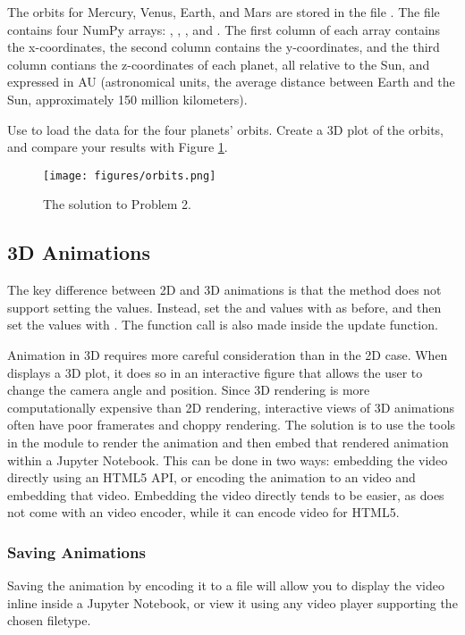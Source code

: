 \begin{problem}
The orbits for Mercury, Venus, Earth, and Mars are stored in the file .
The file contains four NumPy arrays: , , , and .
The first column of each array contains the x-coordinates, the second column contains the y-coordinates, and the third column contians the z-coordinates of each planet, all relative to the Sun, and expressed in AU (astronomical units, the average distance between Earth and the Sun, approximately 150 million kilometers).

Use  to load the data for the four planets' orbits.
Create a 3D plot of the orbits, and compare your results with Figure \ref{lab0:3dplot}.
\end{problem}

\begin{figure}[H]
\centering
\texttt{[image: figures/orbits.png]}
\caption{The solution to Problem 2.}
\label{lab0:3dplot}
\end{figure}

\subsection*{3D Animations}
The key difference between 2D and 3D animations is that the  method does not support setting the  values.
Instead, set the  and  values with  as before, and then set the  values with .
The  function call is also made inside the update function. 

Animation in 3D requires more careful consideration than in the 2D case.
When  displays a 3D plot, it does so in an interactive figure that allows the user to change the camera angle and position.
Since 3D rendering is more computationally expensive than 2D rendering, interactive views of 3D animations often have poor framerates and choppy rendering.
The solution is to use the tools in the  module to render the animation and then embed that rendered animation within a Jupyter Notebook.
This can be done in two ways: embedding the video directly using an HTML5 API, or encoding the animation to an  video and embedding that video.
Embedding the video directly tends to be easier, as  does not come with an  video encoder, while it can encode video for HTML5.

\subsubsection*{Saving Animations}
Saving the animation by encoding it to a  file will allow you to display the video inline inside a Jupyter Notebook, or view it using any video player supporting the chosen filetype. 

